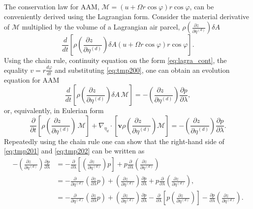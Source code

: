 \documentclass{agujournal}
\begin{document}
{The conservation law for AAM, $\mathcal{M}=\left( u+\Omega r \cos \varphi \right) r \cos \varphi$, can be conveniently derived using the Lagrangian form. Consider the material derivative of $\mathcal{M}$ multiplied by the volume of a Lagrangian air parcel, $\rho \left( \frac{\partial z\quad }{\partial \eta^{(d)}}\right)\delta A$
\begin{equation}
\frac{d}{dt}\left[ \rho \left( \frac{\partial z\quad }{\partial \eta^{(d)}}\right) \delta A \left( u+\Omega r \cos \varphi \right) r \cos \varphi\right].
\end{equation}
Using the chain rule, continuity equation on the form \eqref{eq:lagra_cont}, the equality $v=r\frac{d\varphi}{dt}$ and substituting \eqref{eq:tmp200}, one can obtain an evolution equation for AAM
\begin{equation}
\frac{d}{dt}\left[ \rho \left( \frac{\partial z\quad }{\partial \eta^{(d)}}\right) \delta A\, \mathcal{M} \right]=- \left( \frac{\partial z\quad }{\partial \eta^{(d)}}\right) \frac{\partial p}{\partial \lambda},\label{eq:tmp201}
\end{equation}
or, equivalently, in Eulerian form
\begin{equation}
\frac{\partial}{\partial t}\left[ \rho \left( \frac{\partial z\quad }{\partial \eta^{(d)}}\right) \, \mathcal{M} \right]+\nabla_{\eta_d}\cdot \left[\mathbf{v} \rho \left( \frac{\partial z\quad }{\partial \eta^{(d)}}\right)  \mathcal{M} \right]=- \left( \frac{\partial z\quad }{\partial \eta^{(d)}}\right) \frac{\partial p}{\partial \lambda}.\label{eq:tmp202}
\end{equation}
Repeatedly using the chain rule one can show that the right-hand side of \eqref{eq:tmp201} and \eqref{eq:tmp202} can be written as
\begin{align}
- \left( \frac{\partial z\quad }{\partial \eta^{(d)}}\right)\frac{\partial p}{\partial \lambda}&=-\frac{\partial }{\partial \lambda}\left[  \left( \frac{\partial z\quad }{\partial \eta^{(d)}}\right) p\right]+p\frac{\partial }{\partial \lambda} \left( \frac{\partial z\quad }{\partial \eta^{(d)}}\right)\\ 
&=-\frac{\partial \quad}{\partial \eta^{(d)}}\left( \frac{\partial z}{\partial \lambda}p\right)+\left( \frac{\partial z\quad }{\partial \eta^{(d)}}\right)\frac{\partial p}{\partial \lambda}+p\frac{\partial }{\partial \lambda}\left( \frac{\partial z\quad }{\partial \eta^{(d)}}\right),\\
&=-\frac{\partial \quad}{\partial \eta^{(d)}}\left( \frac{\partial z}{\partial \lambda}p\right)+\left( \frac{\partial z\quad }{\partial \eta^{(d)}}\right)\frac{\partial p}{\partial \lambda}-\frac{\partial }{\partial \lambda}\left[ p\left( \frac{\partial z\quad }{\partial \eta^{(d)}}\right)\right]-\frac{\partial p}{\partial \lambda}\left( \frac{\partial z\quad }{\partial \eta^{(d)}}\right).\\

\end{align}}
\end{document}
